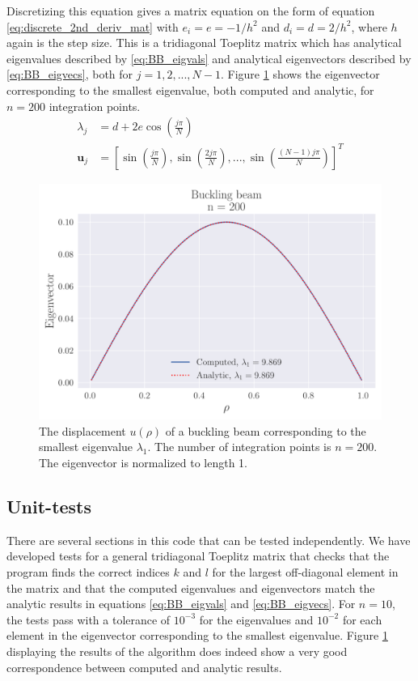 \documentclass[reprint,english,notitlepage,nofootinbib]{revtex4-1}  %
\begin{document}
Discretizing this equation gives a matrix equation on the form of equation \ref{eq:discrete_2nd_deriv_mat} with $e_i = e = -1/h^2$ and $d_i = d = 2/h^2$, where $h$ again is the step size. This is a tridiagonal Toeplitz matrix which has analytical eigenvalues described by \ref{eq:BB_eigvals} and analytical eigenvectors described by \ref{eq:BB_eigvecs}, both for $j = 1, 2, ..., N-1$. Figure \ref{fig:BB200} shows the eigenvector corresponding to the smallest eigenvalue, both computed and analytic, for $n = 200$ integration points.
\begin{align}
  \lambda_j &= d + 2 e \cos{\left( \frac{j \pi}{N} \right)} \label{eq:BB_eigvals} \\
  \mathbf u_j &= \left[ \sin{\left( \frac{j \pi}{N} \right)}, \sin{\left( \frac{2 j \pi}{N} \right)}, ..., \sin{\left( \frac{(N-1) j \pi}{N} \right)} \right]^T \label{eq:BB_eigvecs}
\end{align}

\begin{figure}[h]
	\centering
	\includegraphics[width=\linewidth]{../output/BB_200_0.pdf}
	\caption{The displacement $u(\rho)$ of a buckling beam corresponding to the smallest eigenvalue $\lambda_1$. The number of integration points is $n = 200$. The eigenvector is normalized to length 1.}
  \label{fig:BB200}
\end{figure}


\subsection{Unit-tests}

There are several sections in this code that can be tested independently. We have developed tests for a general tridiagonal Toeplitz matrix that checks that the program finds the correct indices $k$ and $l$ for the largest off-diagonal element in the matrix and that the computed eigenvalues and eigenvectors match the analytic results in equations \ref{eq:BB_eigvals} and \ref{eq:BB_eigvecs}. For $n = 10$, the tests pass with a tolerance of $10^{-3}$ for the eigenvalues and $10^{-2}$ for each element in the eigenvector corresponding to the smallest eigenvalue. Figure \ref{fig:BB200} displaying the results of the algorithm does indeed show a very good correspondence between computed and analytic results.
\end{document}
